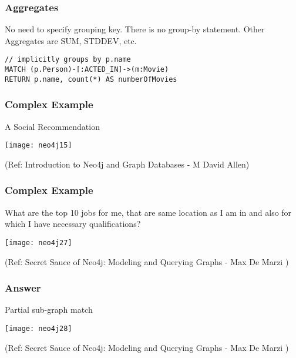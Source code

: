 \begin{frame}[fragile]\frametitle{Aggregates}
No need to specify grouping key. There is no group-by statement. Other Aggregates are SUM, STDDEV, etc.


\begin{lstlisting}
// implicitly groups by p.name
MATCH (p.Person)-[:ACTED_IN]->(m:Movie)
RETURN p.name, count(*) AS numberOfMovies
\end{lstlisting}	  


\end{frame}

\begin{frame}[fragile]\frametitle{Complex Example}
A Social Recommendation

\begin{center}
\texttt{[image: neo4j15]}
\end{center}	  


{\tiny (Ref: Introduction to Neo4j and Graph Databases
 - M David Allen)}

\end{frame}



\begin{frame}[fragile]\frametitle{Complex Example}
What are the top 10 jobs for me, that are same location as I am in and also for which I have necessary qualifications?

\begin{center}
\texttt{[image: neo4j27]}
\end{center}	    



{\tiny (Ref: Secret Sauce of Neo4j: Modeling and Querying Graphs
 - Max De Marzi )}

\end{frame}

\begin{frame}[fragile]\frametitle{Answer}

Partial sub-graph match

\begin{center}
\texttt{[image: neo4j28]}
\end{center}	    


{\tiny (Ref: Secret Sauce of Neo4j: Modeling and Querying Graphs
 - Max De Marzi )}

\end{frame}


